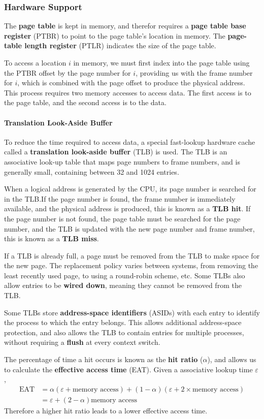 \documentclass{article}
\begin{document}
\subsubsection{Hardware Support}
The \textbf{page table} is kept in memory, and therefor requires a
\textbf{page table base register} (PTBR) to point to the page table's
location in memory. The \textbf{page-table length register} (PTLR)
indicates the size of the page table.

To access a location \(i\) in memory, we must first index into the page
table using the PTBR offset by the page number for \(i\), providing us
with the frame number for \(i\), which is combined with the page offset
to produce the physical address. This process requires two memory
accesses to access data. The first access is to the page table, and the
second access is to the data.
\paragraph{Translation Look-Aside Buffer}
To reduce the time required to access data, a special fast-lookup
hardware cache called a \textbf{translation look-aside buffer} (TLB) is
used. The TLB is an associative look-up table that maps page numbers to
frame numbers, and is generally small, containing between 32 and 1024
entries.

When a logical address is generated by the CPU, its page number is
searched for in the TLB.\@ If the page number is found, the frame
number is immediately available, and the physical address is produced,
this is known as a \textbf{TLB hit}. If the page number is not found,
the page table must be searched for the page number, and the TLB is
updated with the new page number and frame number, this is known as a
\textbf{TLB miss}.

If a TLB is already full, a page must be removed from the TLB to make
space for the new page. The replacement policy varies between systems,
from removing the least recently used page, to using a round-robin
scheme, etc. Some TLBs also allow entries to be \textbf{wired down},
meaning they cannot be removed from the TLB.\@

Some TLBs store \textbf{address-space identifiers} (ASIDs) with each
entry to identify the process to which the entry belongs. This allows
additional address-space protection, and also allows the TLB to contain
entries for multiple processes, without requiring a \textbf{flush} at
every context switch.

The percentage of time a hit occurs is known as the \textbf{hit ratio}
(\(\alpha\)), and allows us to calculate the \textbf{effective access
time} (EAT). Given a associative lookup time \(\varepsilon\),
\begin{align*}
    \text{EAT} & = \alpha \left( \varepsilon + \text{memory access} \right) + \left( 1 - \alpha \right) \left( \varepsilon + 2\times\text{memory access} \right) \\
               & = \varepsilon + \left( 2 - \alpha \right) \text{memory access}
\end{align*}
Therefore a higher hit ratio leads to a lower effective access time.
\end{document}
